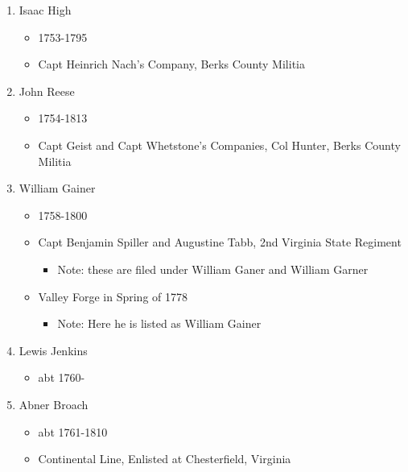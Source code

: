 \documentclass[11pt,letter]{book}
\begin{document}
\begin{enumerate}
\item Isaac High
\begin{itemize}
\item 1753-1795
\item Capt Heinrich Nach's Company, Berks County Militia 
\end{itemize}

\item John Reese
\begin{itemize}
\item 1754-1813
\item Capt Geist and Capt Whetstone's Companies, Col Hunter, Berks County Militia 
\end{itemize}

\item William Gainer
\begin{itemize}
\item 1758-1800
\item Capt Benjamin Spiller and Augustine Tabb, 2nd Virginia State Regiment 
\begin{itemize}
\item Note: these are filed under William Ganer and William Garner
\end{itemize}
\item Valley Forge in Spring of 1778 
\begin{itemize}
\item Note: Here he is listed as William Gainer 
\end{itemize}
\end{itemize}

\item Lewis Jenkins
\begin{itemize}
\item abt 1760-
\end{itemize}

\item Abner Broach
\begin{itemize}
\item abt 1761-1810
\item Continental Line, Enlisted at Chesterfield, Virginia 
\end{itemize}


\end{enumerate}
\end{document}
